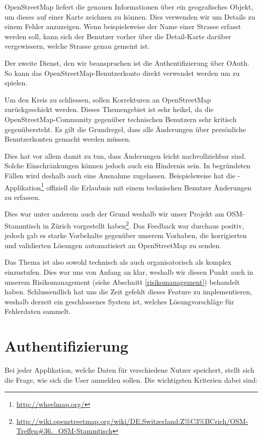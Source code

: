 \gls{OpenStreetMap} liefert die genauen Informationen über ein geografisches Objekt, um dieses auf einer Karte zeichnen zu können.
Dies verwenden wir um Details zu einem Fehler anzuzeigen.
Wenn beispielsweise der Name einer Strasse erfasst werden soll, kann sich der Benutzer vorher über die Detail-Karte darüber vergewissern, welche Strasse genau gemeint ist.

Der zweite Dienst, den wir beanspruchen ist die Authentifizierung über \gls{OAuth}.
So kann das \gls{OpenStreetMap}-Benutzerkonto direkt verwendet werden um \kort zu spielen.

Um den Kreis zu schliessen, sollen Korrekturen an \gls{OpenStreetMap} zurückgeschickt werden.
Dieses Themengebiet ist sehr heikel, da die \gls{OpenStreetMap}-Community gegenüber technischen Benutzern sehr kritisch gegenübersteht.
Es gilt die Grundregel, dass alle Änderungen über persönliche Benutzerkonten gemacht werden müssen.

Dies hat vor allem damit zu tun, dass Änderungen leicht nachvollziehbar sind.
Solche Einschränkungen können jedoch auch ein Hindernis sein.
In begründeten Fällen wird deshalb auch eine Ausnahme zugelassen.
Beispielsweise hat die -Applikation\footnote{\url{http://wheelmap.org/}} offiziell die Erlaubnis mit einem technischen Benutzer Änderungen zu erfassen.

Dies war unter anderem auch der Grund weshalb wir unser Projekt am OSM-Stammtisch in Zürich vorgestellt haben\footnote{\url{http://wiki.openstreetmap.org/wiki/DE:Switzerland:Z\%C3\%BCrich/OSM-Treffen\#36._OSM-Stammtisch}}.
Das Feedback war durchaus positiv, jedoch gab es starke Vorbehalte gegenüber unserem Vorhaben, die korrigierten und validierten Lösungen automatisiert an \gls{OpenStreetMap} zu senden.

Das Thema ist also sowohl technisch als auch organisatorisch als komplex einzustufen.
Dies war uns von Anfang an klar, weshalb wir diesen Punkt auch in unserem Risikomanagement (siehe Abschnitt \ref{risikomanagement}) behandelt haben.
Schlussendlich hat uns die Zeit gefehlt dieses Feature zu implementieren, weshalb \kort derzeit ein geschlossenes System ist, welches Lösungvorschläge für Fehlerdaten sammelt.

\section{Authentifizierung}
Bei jeder Applikation, welche Daten für verschiedene Nutzer speichert, stellt sich die Frage, wie sich die User anmelden sollen.
Die wichtigsten Kriterien dabei sind:

